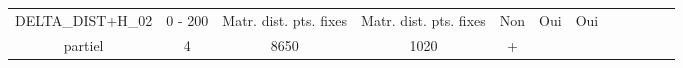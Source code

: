 \documentclass{report}
\begin{document}
\begin{landscape}
\begin{tabular}{|c|c|c|c|c|c|c|c|c|c|c|c|}
\begin{minipage}{3.5cm}\vspace{5mm}DELTA\_DIST+H\_02 \vspace{1mm} \end{minipage} &
\begin{minipage}{1.3cm}0 - 200 \end{minipage} &
\begin{minipage}{1.8cm}Matr. dist. pts. fixes \end{minipage} &
\begin{minipage}{1.8cm}Matr. dist. pts. fixes \end{minipage} &
\begin{minipage}{1.4cm}Non \end{minipage} &
\begin{minipage}{1.4cm}Oui \end{minipage} &
\begin{minipage}{2cm} Oui \end{minipage} &
\begin{minipage}{1.8cm}RMSE\\ partiel \end{minipage}&
\begin{minipage}{1.65cm} 4 \end{minipage}&
\begin{minipage}{1.2cm} 8650 \end{minipage} &
\begin{minipage}{1cm}1020 \end{minipage} &
\begin{minipage}{0.9cm}+ \end{minipage} \\  \hline


\end{tabular}
\end{landscape}
\end{document}

